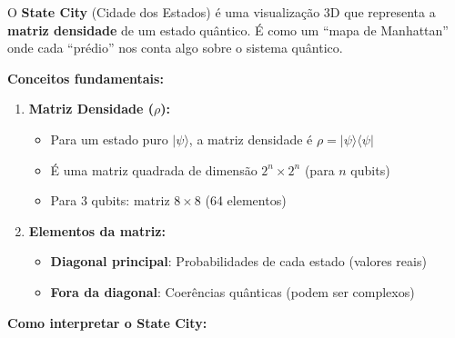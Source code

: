 \documentclass[
  brazilian,
]{report}
\providecommand{\tightlist}{%
  \setlength{\itemsep}{0pt}\setlength{\parskip}{0pt}}
\begin{document}
O \textbf{State City} (Cidade dos Estados) é uma visualização 3D que
representa a \textbf{matriz densidade} de um estado quântico. É como um
``mapa de Manhattan'' onde cada ``prédio'' nos conta algo sobre o
sistema quântico.

\textbf{Conceitos fundamentais:}

\begin{enumerate}
\def\labelenumi{\arabic{enumi}.}
\tightlist
\item
  \textbf{Matriz Densidade (\(\rho\)):}

  \begin{itemize}
  \tightlist
  \item
    Para um estado puro \(|\psi\rangle\), a matriz densidade é
    \(\rho = |\psi\rangle\langle\psi|\)
  \item
    É uma matriz quadrada de dimensão \(2^n \times 2^n\) (para \(n\)
    qubits)
  \item
    Para 3 qubits: matriz \(8 \times 8\) (64 elementos)
  \end{itemize}
\item
  \textbf{Elementos da matriz:}

  \begin{itemize}
  \tightlist
  \item
    \textbf{Diagonal principal}: Probabilidades de cada estado (valores
    reais)
  \item
    \textbf{Fora da diagonal}: Coerências quânticas (podem ser
    complexos)
  \end{itemize}
\end{enumerate}

\textbf{Como interpretar o State City:}
\end{document}
